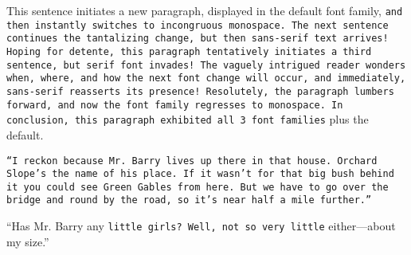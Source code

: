 \documentclass[a4paper]{article}
\begin{document}
This sentence initiates a new paragraph, displayed in the default font family, \texttt{and then instantly switches to incongruous monospace. The next sentence continues the tantalizing change, \textsf{but then sans-serif text arrives! Hoping for detente, this paragraph tentatively initiates a third sentence, \textrm{but serif font invades! The vaguely intrigued reader wonders when, where, and how the next font change will occur,} and immediately, sans-serif reasserts its presence! Resolutely, the paragraph lumbers forward, and} now the font family regresses to monospace. In conclusion, this paragraph exhibited all 3 font families} plus the default.

\texttt{``I reckon because Mr. Barry lives up there in that house. \textrm{Orchard Slope's the name of his place. }\textsf{If it wasn't for that big bush behind it you could see Green Gables from here.} But we have to go over the bridge and round by the road, so it's near half a mile further.''}

``Has \textsf{Mr. Barry any \texttt{little girls? Well, \textrm{not so} very little} either---about my} size.''
\end{document}
